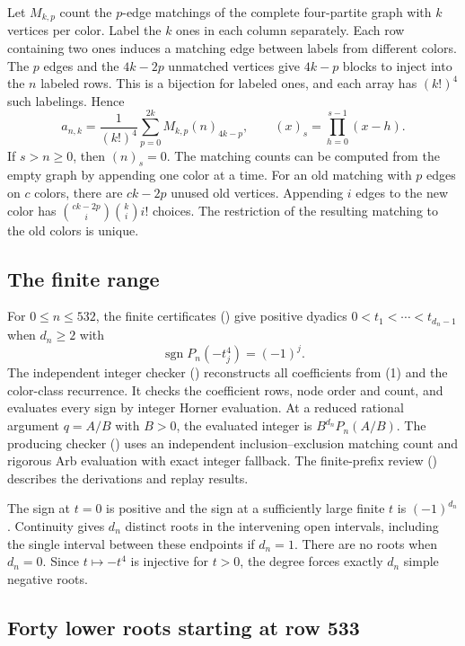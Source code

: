 \documentclass[11pt]{article}
\begin{document}
Let $M_{k,p}$ count the $p$-edge matchings of the complete four-partite graph with $k$ vertices per color. Label the $k$ ones in each column separately. Each row containing two ones induces a matching edge between labels from different colors. The $p$ edges and the $4k-2p$ unmatched vertices give $4k-p$ blocks to inject into the $n$ labeled rows. This is a bijection for labeled ones, and each array has $(k!)^4$ such labelings. Hence
\[
a_{n,k}=\frac{1}{(k!)^4}\sum_{p=0}^{2k} M_{k,p}(n)_{4k-p},
\qquad
(x)_s=\prod_{h=0}^{s-1}(x-h).
\tag{1}
\]
If $s>n\ge0$, then $(n)_s=0$. The matching counts can be computed from the empty graph by appending one color at a time. For an old matching with $p$ edges on $c$ colors, there are $ck-2p$ unused old vertices. Appending $i$ edges to the new color has $\binom{ck-2p}{i}\binom{k}{i}i!$ choices. The restriction of the resulting matching to the old colors is unique.

\subsection{The finite range}
\label{sec:the-finite-range}

For $0\le n\le532$, the finite certificates () give positive dyadics $0<t_1<\cdots<t_{d_n-1}$ when $d_n\ge2$ with
\[
\operatorname{sgn}P_n(-t_j^4)=(-1)^j.
\]
The independent integer checker () reconstructs all coefficients from (1) and the color-class recurrence. It checks the coefficient rows, node order and count, and evaluates every sign by integer Horner evaluation. At a reduced rational argument $q=A/B$ with $B>0$, the evaluated integer is $B^{d_n}P_n(A/B)$. The producing checker () uses an independent inclusion--exclusion matching count and rigorous Arb evaluation with exact integer fallback. The finite-prefix review () describes the derivations and replay results.

The sign at $t=0$ is positive and the sign at a sufficiently large finite $t$ is $(-1)^{d_n}$. Continuity gives $d_n$ distinct roots in the intervening open intervals, including the single interval between these endpoints if $d_n=1$. There are no roots when $d_n=0$. Since $t\mapsto-t^4$ is injective for $t>0$, the degree forces exactly $d_n$ simple negative roots.

\subsection{Forty lower roots starting at row 533}
\label{sec:forty-lower-roots-for-every-nge533}
\end{document}
